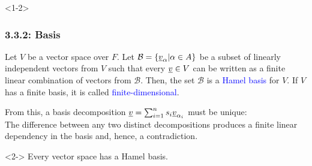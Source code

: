 \documentclass[10pt,english,aspectratio=169]{beamer}
\begin{document}
\begin{frame}<1-2> \frametitle{3.3.2: Basis}

\begin{definition}
Let $V$ be a vector space over $F$.
Let $\mathcal{B} = \left\{ \underline{v}_{\alpha} | \alpha \in A \right\}$ be a subset of linearly independent vectors from $V$ such that every $\underline{v} \in V$ can be written as a finite linear combination of vectors from $\mathcal{B}$.
Then, the set $\mathcal{B}$ is a \textcolor{blue}{Hamel basis} for $V$.
If $V$ has a finite basis, it is called \textcolor{blue}{finite-dimensional}.
\end{definition}

\vspace{3mm}

From this, a basis decomposition $\underline{v} = \sum_{i=1}^n s_i \underline{v}_{\alpha_i}$ must be unique: \\[1mm]
\hspace{5mm} The difference between any two distinct decompositions produces a finite linear dependency in the basis and, hence, a contradiction.

\vspace{3mm}

\begin{theorem}<2->
Every vector space has a Hamel basis.
\end{theorem}


\end{frame}
\end{document}
